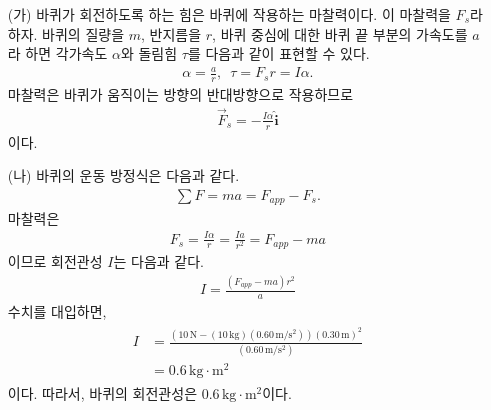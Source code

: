 \documentclass[floatfix,nofootinbib,superscriptaddress,fleqn]{revtex4-2}
\begin{document}
\begin{itemize}
  \item[(가)] 바퀴가 회전하도록 하는 힘은 바퀴에 작용하는 마찰력이다.
  이 마찰력을 $F_s$라 하자.
  바퀴의 질량을 $m$, 반지름을 $r$, 바퀴 중심에 대한 바퀴 끝 부분의 가속도를 
  $a$라 하면
  각가속도 $\alpha$와 돌림힘 $\tau$를 다음과 같이 표현할 수 있다.
  \begin{align}
    \alpha=\frac{a}{r},\,\,\, \tau = F_s r = I\alpha.
  \end{align}
  마찰력은 바퀴가 움직이는 방향의 반대방향으로 작용하므로
  \begin{align}
    \vec{F}_s = -\frac{I\alpha}{r}\hat{\bm i}
  \end{align}
  이다.
  \item[(나)]
  바퀴의 운동 방정식은 다음과 같다.
  \begin{align}
    \sum F = ma = F_{app} - F_s.
  \end{align}
  마찰력은
  \begin{align}
    F_s=\frac{I\alpha}{r} = \frac{Ia}{r^2} = F_{app}-ma
  \end{align}
이므로 회전관성 $I$는 다음과 같다.
\begin{align}
  I = \frac{(F_{app}-ma)r^2}{a}
\end{align}
  수치를 대입하면,
  \begin{align}
    \begin{split}
      I &= \frac{(10\,\mathrm{N} - (10\,\mathrm{kg})(0.60\,\mathrm{m/s^2}))
      (0.30\,\mathrm{m})^2}{(0.60\,\mathrm{m/s^2})} \\
      &=0.6\,\mathrm{kg\cdot m^2}
    \end{split}
  \end{align}
  이다. 따라서, 바퀴의 회전관성은 $0.6\,\mathrm{kg\cdot m^2}$이다.
\end{itemize}

\vspace{1.cm}
\end{document}

